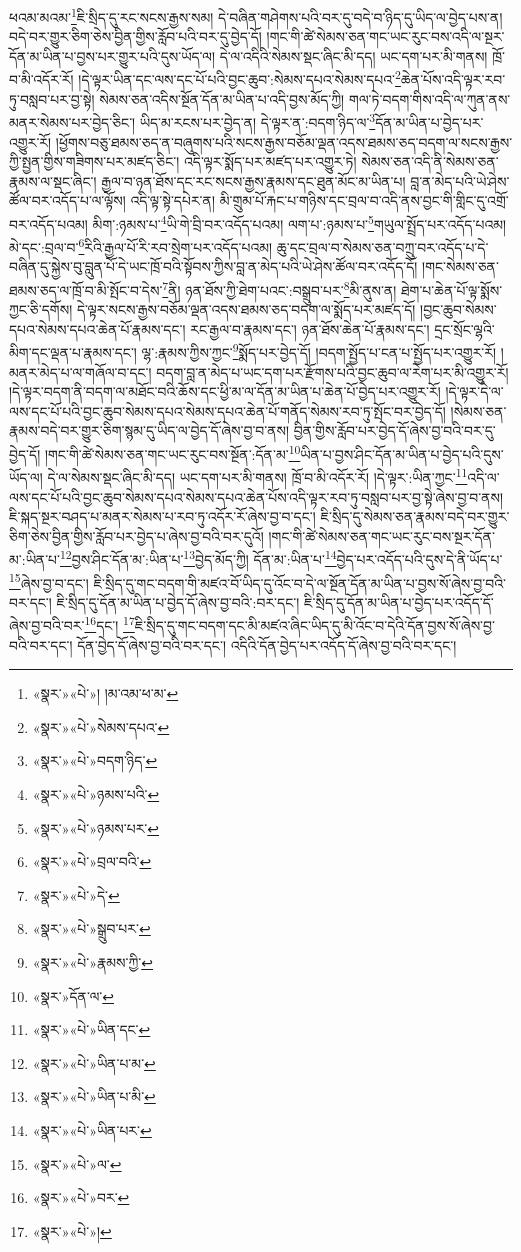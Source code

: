 ཕའམ་མའམ་\footnote{«སྣར་»«པེ་»། །མ་འམ་ཕ་མ་}ཇི་སྲིད་དུ་རང་སངས་རྒྱས་སམ། དེ་བཞིན་གཤེགས་པའི་བར་དུ་བདེ་བ་ཉིད་དུ་ཡིད་ལ་བྱེད་པས་ན། བདེ་བར་གྱུར་ཅིག་ཅེས་བྱིན་གྱིས་རློབ་པའི་བར་དུ་བྱེད་དོ། །གང་གི་ཚེ་སེམས་ཅན་གང་ཡང་རུང་བས་འདི་ལ་སྔར་དོན་མ་ཡིན་པ་བྱས་པར་གྱུར་པའི་དུས་ཡོད་ལ། དེ་ལ་འདིའི་སེམས་སྡང་ཞིང་མི་དད། ཡང་དག་པར་མི་གནས། ཁྲོ་བ་མི་འདོར་རོ། །དེ་ལྟར་ཡིན་དང་ལས་དང་པོ་པའི་བྱང་ཆུབ་:སེམས་དཔའ་སེམས་དཔའ་\footnote{«སྣར་»«པེ་»སེམས་དཔའ་}ཆེན་པོས་འདི་ལྟར་རབ་ཏུ་བསླབ་པར་བྱ་སྟེ། སེམས་ཅན་འདིས་སྔོན་དོན་མ་ཡིན་པ་འདི་བྱས་མོད་ཀྱི། གལ་ཏེ་བདག་གིས་འདི་ལ་ཀུན་ནས་མནར་སེམས་པར་བྱེད་ཅིང་། ཡིད་མ་རངས་པར་བྱེད་ན། དེ་ལྟར་ན་:བདག་ཉིད་ལ་\footnote{«སྣར་»«པེ་»བདག་ཉིད་}དོན་མ་ཡིན་པ་བྱེད་པར་འགྱུར་རོ། །ཕྱོགས་བཅུ་ཐམས་ཅད་ན་བཞུགས་པའི་སངས་རྒྱས་བཅོམ་ལྡན་འདས་ཐམས་ཅད་བདག་ལ་སངས་རྒྱས་ཀྱི་སྤྱན་གྱིས་གཟིགས་པར་མཛད་ཅིང་། འདི་ལྟར་སྨོད་པར་མཛད་པར་འགྱུར་ཏེ། སེམས་ཅན་འདི་ནི་སེམས་ཅན་རྣམས་ལ་སྡང་ཞིང་། རྒྱལ་བ་ཉན་ཐོས་དང་རང་སངས་རྒྱས་རྣམས་དང་ཐུན་མོང་མ་ཡིན་པ། བླ་ན་མེད་པའི་ཡེ་ཤེས་ཚོལ་བར་འདོད་པ་ལ་ལྟོས། འདི་ལྟ་སྟེ་དཔེར་ན། མི་གྲུམ་པོ་རྐང་པ་གཉིས་དང་བྲལ་བ་འདི་ནས་བྱང་གི་གླིང་དུ་འགྲོ་བར་འདོད་པའམ། མིག་:ཉམས་པ་\footnote{«སྣར་»«པེ་»ཉམས་པའི་}ཡི་གེ་བྲི་བར་འདོད་པའམ། ལག་པ་:ཉམས་པ་\footnote{«སྣར་»«པེ་»ཉམས་པར་}གཡུལ་སྤྲོད་པར་འདོད་པའམ། མེ་དང་:བྲལ་བ་\footnote{«སྣར་»«པེ་»བྲལ་བའི་}རིའི་རྒྱལ་པོ་རི་རབ་སྲེག་པར་འདོད་པའམ། ཆུ་དང་བྲལ་བ་སེམས་ཅན་བཀྲུ་བར་འདོད་པ་དེ་བཞིན་དུ་སྐྱེས་བུ་བླུན་པོ་དེ་ཡང་ཁྲོ་བའི་སྟོབས་ཀྱིས་བླ་ན་མེད་པའི་ཡེ་ཤེས་ཚོལ་བར་འདོད་དོ། །གང་སེམས་ཅན་ཐམས་ཅད་ལ་ཁྲོ་བ་མི་སྤོང་བ་དེས་\footnote{«སྣར་»«པེ་»དེ་}ནི། ཉན་ཐོས་ཀྱི་ཐེག་པའང་:བསྒྲུབ་པར་\footnote{«སྣར་»«པེ་»སྒྲུབ་པར་}མི་ནུས་ན། ཐེག་པ་ཆེན་པོ་ལྟ་སྨོས་ཀྱང་ཅི་དགོས། དེ་ལྟར་སངས་རྒྱས་བཅོམ་ལྡན་འདས་ཐམས་ཅད་བདག་ལ་སྨོད་པར་མཛད་དོ། །བྱང་ཆུབ་སེམས་དཔའ་སེམས་དཔའ་ཆེན་པོ་རྣམས་དང་། རང་རྒྱལ་བ་རྣམས་དང་། ཉན་ཐོས་ཆེན་པོ་རྣམས་དང་། དྲང་སྲོང་ལྷའི་མིག་དང་ལྡན་པ་རྣམས་དང་། ལྷ་:རྣམས་ཀྱིས་ཀྱང་\footnote{«སྣར་»«པེ་»རྣམས་ཀྱི་}སྨོད་པར་བྱེད་དོ། །བདག་སྤྱོད་པ་ངན་པ་སྤྱོད་པར་འགྱུར་རོ། །མནར་མེད་པ་ལ་གཞོལ་བ་དང་། བདག་བླ་ན་མེད་པ་ཡང་དག་པར་རྫོགས་པའི་བྱང་ཆུབ་ལ་རེག་པར་མི་འགྱུར་རོ། །དེ་ལྟར་བདག་ནི་བདག་ལ་མཐོང་བའི་ཆོས་དང་ཕྱི་མ་ལ་དོན་མ་ཡིན་པ་ཆེན་པོ་བྱེད་པར་འགྱུར་རོ། །དེ་ལྟར་དེ་ལ་ལས་དང་པོ་པའི་བྱང་ཆུབ་སེམས་དཔའ་སེམས་དཔའ་ཆེན་པོ་གནོད་སེམས་རབ་ཏུ་སྤོང་བར་བྱེད་དོ། །སེམས་ཅན་རྣམས་བདེ་བར་གྱུར་ཅིག་སྙམ་དུ་ཡིད་ལ་བྱེད་དོ་ཞེས་བྱ་བ་ནས། བྱིན་གྱིས་རློབ་པར་བྱེད་དོ་ཞེས་བྱ་བའི་བར་དུ་བྱེད་དོ། །གང་གི་ཚེ་སེམས་ཅན་གང་ཡང་རུང་བས་སྔོན་:དོན་མ་\footnote{«སྣར་»དོན་ལ་}ཡིན་པ་བྱས་ཤིང་དོན་མ་ཡིན་པ་བྱེད་པའི་དུས་ཡོད་ལ། དེ་ལ་སེམས་སྡང་ཞིང་མི་དད། ཡང་དག་པར་མི་གནས། ཁྲོ་བ་མི་འདོར་རོ། །དེ་ལྟར་:ཡིན་ཀྱང་\footnote{«སྣར་»«པེ་»ཡིན་དང་}འདི་ལ་ལས་དང་པོ་པའི་བྱང་ཆུབ་སེམས་དཔའ་སེམས་དཔའ་ཆེན་པོས་འདི་ལྟར་རབ་ཏུ་བསླབ་པར་བྱ་སྟེ་ཞེས་བྱ་བ་ནས། ཇི་སྐད་སྔར་བཤད་པ་མནར་སེམས་པ་རབ་ཏུ་འདོར་རོ་ཞེས་བྱ་བ་དང་། ཇི་སྲིད་དུ་སེམས་ཅན་རྣམས་བདེ་བར་གྱུར་ཅིག་ཅེས་བྱིན་གྱིས་རློབ་པར་བྱེད་པ་ཞེས་བྱ་བའི་བར་དུའོ། །གང་གི་ཚེ་སེམས་ཅན་གང་ཡང་རུང་བས་སྔར་དོན་མ་:ཡིན་པ་\footnote{«སྣར་»«པེ་»ཡིན་པ་མ་}བྱས་ཤིང་དོན་མ་:ཡིན་པ་\footnote{«སྣར་»«པེ་»ཡིན་པ་མི་}བྱེད་མོད་ཀྱི། དོན་མ་:ཡིན་པ་\footnote{«སྣར་»«པེ་»ཡིན་པར་}བྱེད་པར་འདོད་པའི་དུས་དེ་ནི་ཡོད་པ་\footnote{«སྣར་»«པེ་»ལ་}ཞེས་བྱ་བ་དང་། ཇི་སྲིད་དུ་གང་བདག་གི་མཛའ་བོ་ཡིད་དུ་འོང་བ་དེ་ལ་སྔོན་དོན་མ་ཡིན་པ་བྱས་སོ་ཞེས་བྱ་བའི་བར་དང་། ཇི་སྲིད་དུ་དོན་མ་ཡིན་པ་བྱེད་དོ་ཞེས་བྱ་བའི་:བར་དང་། ཇི་སྲིད་དུ་དོན་མ་ཡིན་པ་བྱེད་པར་འདོད་དོ་ཞེས་བྱ་བའི་བར་\footnote{«སྣར་»«པེ་»བར་}དང་། \footnote{«སྣར་»«པེ་»།  }ཇི་སྲིད་དུ་གང་བདག་དང་མི་མཛའ་ཞིང་ཡིད་དུ་མི་འོང་བ་དེའི་དོན་བྱས་སོ་ཞེས་བྱ་བའི་བར་དང་། དོན་བྱེད་དོ་ཞེས་བྱ་བའི་བར་དང་། འདིའི་དོན་བྱེད་པར་འདོད་དོ་ཞེས་བྱ་བའི་བར་དང་། 